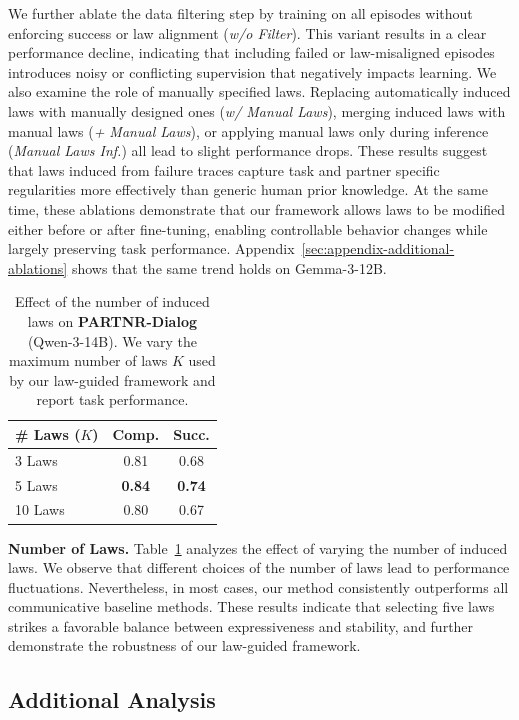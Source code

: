 \documentclass{article}
\theoremstyle{plain}
\theoremstyle{definition}
\theoremstyle{remark}
\begin{document}
We further ablate the data filtering step by training on all episodes without enforcing success or law alignment (\textit{w/o Filter}). This variant results in a clear performance decline, indicating that including failed or law-misaligned episodes introduces noisy or conflicting supervision that negatively impacts learning. We also examine the role of manually specified laws. Replacing automatically induced laws with manually designed ones (\textit{w/ Manual Laws}), merging induced laws with manual laws (\textit{+ Manual Laws}), or applying manual laws only during inference (\textit{Manual Laws Inf.}) all lead to slight performance drops. These results suggest that laws induced from failure traces capture task and partner specific regularities more effectively than generic human prior knowledge. At the same time, these ablations demonstrate that our framework allows laws to be modified either before or after fine-tuning, enabling controllable behavior changes while largely preserving task performance. Appendix~\ref{sec:appendix-additional-ablations} shows that the same trend holds on Gemma-3-12B.


\begin{table}[t]
\centering
\small
\setlength{\tabcolsep}{5pt}
\caption{Effect of the number of induced laws on \textbf{PARTNR-Dialog} (Qwen-3-14B). We vary the maximum number of laws $K$ used by our law-guided framework and report task performance.}
\label{tab:partnr-num-laws}
\begin{tabular}{l|cc}
\toprule
\textbf{\# Laws ($K$)} & \textbf{Comp.} & \textbf{Succ.} \\
\midrule
3 Laws  & 0.81 & 0.68 \\
5 Laws  & \textbf{0.84} & \textbf{0.74} \\
10 Laws & 0.80 & 0.67 \\
\bottomrule
\end{tabular}
\end{table}
\textbf{Number of Laws.}
Table~\ref{tab:partnr-num-laws} analyzes the effect of varying the number of induced laws. We observe that different choices of the number of laws lead to performance fluctuations. Nevertheless, in most cases, our method consistently outperforms all communicative baseline methods. These results indicate that selecting five laws strikes a favorable balance between expressiveness and stability, and further demonstrate the robustness of our law-guided framework.

\subsection{Additional Analysis}
\end{document}
